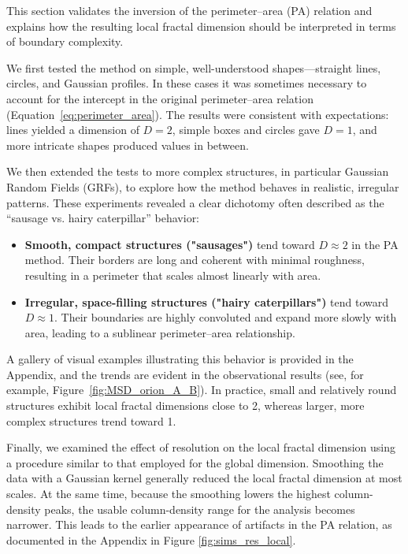 This section validates the inversion of the perimeter–area (PA) relation and explains how the resulting local fractal dimension should be interpreted in terms of boundary complexity.

We first tested the method on simple, well-understood shapes—straight lines, circles, and Gaussian profiles.  
In these cases it was sometimes necessary to account for the intercept in the original perimeter–area relation (Equation~\ref{eq:perimeter_area}).  
The results were consistent with expectations: lines yielded a dimension of \(D = 2\), simple boxes and circles gave \(D = 1\), and more intricate shapes produced values in between.

We then extended the tests to more complex structures, in particular Gaussian Random Fields (GRFs), to explore how the method behaves in realistic, irregular patterns.  
These experiments revealed a clear dichotomy often described as the “sausage vs. hairy caterpillar” behavior:
\begin{itemize}
    \item \textbf{Smooth, compact structures ("sausages")} tend toward \(D \approx 2\) in the PA method. Their borders are long and coherent with minimal roughness, resulting in a perimeter that scales almost linearly with area.
    \item \textbf{Irregular, space-filling structures ("hairy caterpillars")} tend toward \(D \approx 1\). Their boundaries are highly convoluted and expand more slowly with area, leading to a sublinear perimeter–area relationship.
\end{itemize}

A gallery of visual examples illustrating this behavior is provided in the Appendix, and the trends are evident in the observational results (see, for example, Figure~\ref{fig:MSD_orion_A_B}).  
In practice, small and relatively round structures exhibit local fractal dimensions close to 2, whereas larger, more complex structures trend toward 1.

Finally, we examined the effect of resolution on the local fractal dimension using a procedure similar to that employed for the global dimension.  
Smoothing the data with a Gaussian kernel generally reduced the local fractal dimension at most scales.  
At the same time, because the smoothing lowers the highest column-density peaks, the usable column-density range for the analysis becomes narrower.  
This leads to the earlier appearance of artifacts in the PA relation, as documented in the Appendix in Figure \ref{fig:sims_res_local}.

